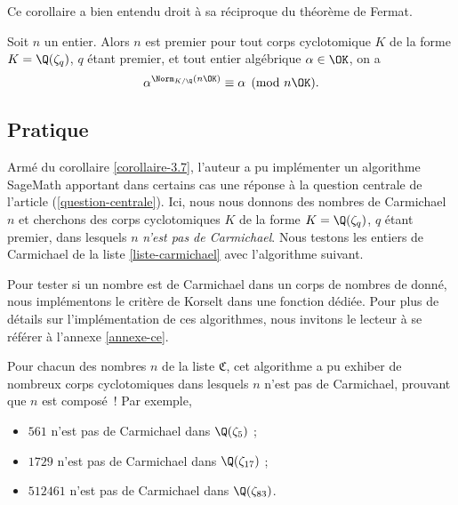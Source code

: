 Ce corollaire a bien entendu droit à sa réciproque du théorème de Fermat.

\begin{theoreme}
	Soit $n$ un entier. Alors $n$ est premier \ssi pour tout corps cyclotomique $K$ de la forme $K = \Q(\zeta_q)$, $q$ étant premier, et tout entier algébrique $\alpha\in \OK$, on a $$\alpha^{\Norm_{K/\Q}(n\OK)} \equiv \alpha \pmod{n\OK}.$$
\end{theoreme}

\subsection{Pratique}

Armé du corollaire \ref{corollaire-3.7}, l'auteur a pu implémenter un algorithme SageMath apportant dans certains cas une réponse à la question centrale de l'article (\ref{question-centrale}). Ici, nous nous donnons des nombres de Carmichael $n$ et cherchons des corps cyclotomiques $K$ de la forme $K = \Q(\zeta_q)$, $q$ étant premier, dans lesquels $n$ \emph{n'est pas de Carmichael}. Nous testons les entiers de Carmichael de la liste \ref{liste-carmichael}  avec l'algorithme suivant.

\vspace{1em}
\begin{algorithm}[H]
\end{algorithm}
\vspace{1em}

\begin{remarque}
	Pour tester si un nombre est de Carmichael dans un corps de nombres de donné, nous implémentons le critère de Korselt dans une fonction dédiée. Pour plus de détails sur l'implémentation de ces algorithmes, nous invitons le lecteur à se référer à l'annexe \ref{annexe-ce}.
\end{remarque}

Pour chacun des nombres $n$ de la liste $\mathfrak{C}$, cet algorithme a pu exhiber de nombreux corps cyclotomiques dans lesquels $n$ n'est pas de Carmichael, prouvant que $n$ est composé~! Par exemple,
\begin{itemize}
	\item $561$ n'est pas de Carmichael dans $\Q(\zeta_5)$ ; 
	\item $1729$ n'est pas de Carmichael dans $\Q(\zeta_{17})$ ;
	\item $512461$ n'est pas de Carmichael dans $\Q(\zeta_{83})$.
\end{itemize}

